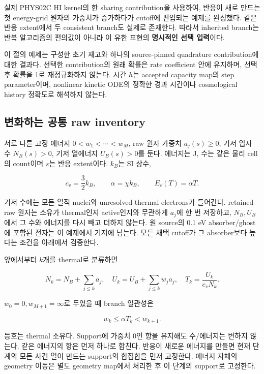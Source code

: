 실제 PHYS02C HI kernel의 한 sharing contribution을 사용하여, 반응이 새로 만드는 첫 energy-grid 원자의 가중치가 증가하다가 cutoff에 편입되는 예제를 완성했다. 같은 반응 extent에서 두 consistent branch도 실제로 존재한다. 따라서 inherited branch는 반복 알고리즘의 편의값이 아니라 이 유한 표현의 \textbf{명시적인 선택 입력}이다.

이 절의 예제는 구성한 초기 재고와 하나의 source-pinned quadrature contribution에 대한 결과다. 선택한 contribution의 원래 확률은 rate coefficient 안에 유지하며, 선택 후 확률을 1로 재정규화하지 않는다. 시간 \(h\)는 accepted capacity map의 step parameter이며, nonlinear kinetic ODE의 정확한 경과 시간이나 cosmological history 정확도로 해석하지 않는다.

\hypertarget{uxbcc0uxd654uxd558uxb294-uxacf5uxd1b5-raw-inventory}{%
\subsection{변화하는 공통 raw inventory}\label{uxbcc0uxd654uxd558uxb294-uxacf5uxd1b5-raw-inventory}}

서로 다른 고정 에너지 \(0<w_1<\cdots<w_M\), raw 원자 가중치 \(a_j(s)\ge0\), 기저 입자 수 \(N_B(s)>0\), 기저 열에너지 \(U_B(s)>0\)를 둔다. 에너지는 J, 수는 같은 물리 cell의 count이며 \(s\)는 반응 extent이다. \(k_B\)는 SI 상수,

\[c_v=\frac32 k_B,\qquad \alpha=\chi k_B,\qquad E_c(T)=\alpha T.\tag{RB.1}\]

기저 수에는 모든 열적 nuclei와 unresolved thermal electrons가 들어간다. retained raw 원자는 소유가 thermal인지 active인지와 무관하게 \(a_j\)에 한 번 저장하고, \(N_B,U_B\)에서 그 수와 에너지를 다시 빼고 더하지 않는다. 원 source의 0.1 eV absorber/ghost에 포함된 전자는 이 예제에서 기저에 남는다. 모든 채택 cutoff가 그 absorber보다 높다는 조건을 아래에서 검증한다.

앞에서부터 \(k\)개를 thermal로 분류하면

\[N_k=N_B+\sum_{j\le k}a_j,\quad U_k=U_B+\sum_{j\le k}w_ja_j,\quad T_k=\frac{U_k}{c_vN_k}.\tag{RB.2}\]

\(w_0=0,w_{M+1}=\infty\)로 두었을 때 branch 일관성은

\[w_k\le\alpha T_k<w_{k+1}.\tag{RB.3}\]

등호는 thermal 소유다. Support에 가중치 0인 항을 유지해도 수/에너지는 변하지 않는다. 같은 에너지의 항은 먼저 하나로 합친다. 반응이 새로운 에너지를 만들면 현재 단계의 모든 사건 열이 만드는 support의 합집합을 먼저 고정한다. 에너지 자체의 geometry 이동은 별도 geometry map에서 처리한 후 이 단계의 support로 고정한다.

